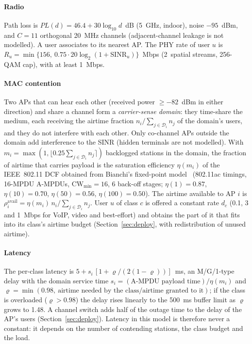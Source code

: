 \paragraph{Radio} Path loss is $PL(d)=46.4+30\log_{10}d$~dB (5~GHz, indoor), noise $-95$~dBm, and $C=11$ orthogonal 20~MHz channels (adjacent-channel leakage is not modelled). A user associates to its nearest AP. The PHY rate of user $u$ is $R_u=\min\{156,\ 0.75\cdot20\log_2(1+\mathrm{SINR}_u)\}$~Mbps (2~spatial streams, 256-QAM cap), with at least 1~Mbps.

\paragraph{MAC contention} Two APs that can hear each other (received power $\ge-82$~dBm in either direction) and share a channel form a \emph{carrier-sense domain}: they time-share the medium, each receiving the airtime fraction $n_i/\sum_{j\in\mathcal{D}_i}n_j$ of the domain's users, and they do not interfere with each other. Only co-channel APs outside the domain add interference to the SINR (hidden terminals are not modelled). With $m_i=\max(1,\lfloor 0.25\sum_{j\in\mathcal{D}_i}n_j\rceil)$ backlogged stations in the domain, the fraction of airtime that carries payload is the saturation efficiency $\eta(m_i)$ of the IEEE~802.11 DCF obtained from Bianchi's fixed-point model~\cite{bianchi2000} (802.11ac timings, 16-MPDU A-MPDUs, $\mathrm{CW}_{\min}=16$, 6 back-off stages; $\eta(1)=0.87$, $\eta(10)=0.70$, $\eta(50)=0.56$, $\eta(100)=0.50$). The airtime available to AP $i$ is $\rho^{\mathrm{avail}}_i=\eta(m_i)\,n_i/\sum_{j\in\mathcal{D}_i}n_j$. User $u$ of class $c$ is offered a constant rate $d_c$ (0.1, 3 and 1~Mbps for VoIP, video and best-effort) and obtains the part of it that fits into its class's airtime budget (Section~\ref{sec:deploy}, with redistribution of unused airtime).

\paragraph{Latency} The per-class latency is $5+s_i\,[1+\varrho/(2(1-\varrho))]$~ms, an M/G/1-type delay with the domain service time $s_i=(\text{A-MPDU payload time})/\eta(m_i)$ and $\varrho=\min(0.98,\ \text{airtime needed by the class}/\text{airtime granted to it})$; if the class is overloaded ($\varrho>0.98$) the delay rises linearly to the 500~ms buffer limit as $\varrho$ grows to 1.48. A channel switch adds half of the outage time to the delay of the AP's users (Section~\ref{sec:deploy}). Latency in this model is therefore never a constant: it depends on the number of contending stations, the class budget and the load.

